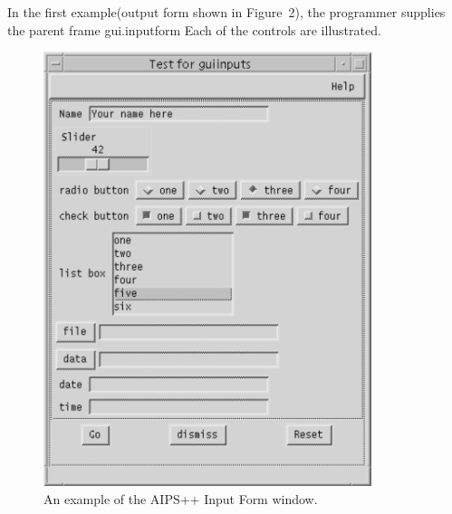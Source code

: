 In the first example(output form shown in Figure~2), the programmer supplies the parent frame gui.inputform
Each of the controls are illustrated.
\begin{figure}[here]
\includegraphics[height=5in]{guiinputframe}
\caption{An example of the AIPS++ Input Form window.}
\end{figure}

